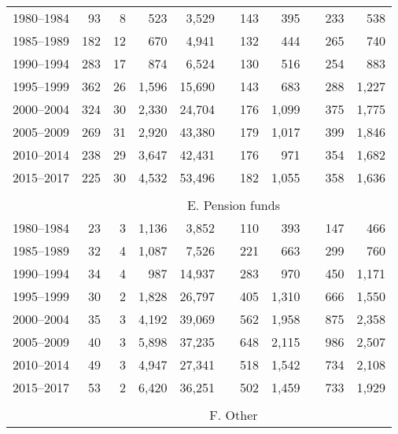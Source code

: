 \documentclass{article}
\begin{document}
\begin{table}[h]
{\begin{tabular}{rrrrrrrrrrr}
            1980–1984 & 93 & 8 & 523 & 3,529 & & 143 & 395 & & 233 & 538 \\
            1985–1989 & 182 & 12 & 670 & 4,941 & & 132 & 444 & & 265 & 740 \\
            1990–1994 & 283 & 17 & 874 & 6,524 & & 130 & 516 & & 254 & 883 \\
            1995–1999 & 362 & 26 & 1,596 & 15,690 & & 143 & 683 & & 288 & 1,227 \\
            2000–2004 & 324 & 30 & 2,330 & 24,704 & & 176 & 1,099 & & 375 & 1,775 \\
            2005–2009 & 269 & 31 & 2,920 & 43,380 & & 179 & 1,017 & & 399 & 1,846 \\
            2010–2014 & 238 & 29 & 3,647 & 42,431 & & 176 & 971 & & 354 & 1,682 \\
            2015–2017 & 225 & 30 & 4,532 & 53,496 & & 182 & 1,055 & & 358 & 1,636 \\
            
            \cline{2-11}
            \\[-2.5ex]
            & \multicolumn{10}{c}{E. Pension funds} \\ \cline{2-11}
            
            1980–1984 & 23 & 3 & 1,136 & 3,852 & & 110 & 393 & & 147 & 466 \\
            1985–1989 & 32 & 4 & 1,087 & 7,526 & & 221 & 663 & & 299 & 760 \\
            1990–1994 & 34 & 4 & 987 & 14,937 & & 283 & 970 & & 450 & 1,171 \\
            1995–1999 & 30 & 2 & 1,828 & 26,797 & & 405 & 1,310 & & 666 & 1,550 \\
            2000–2004 & 35 & 3 & 4,192 & 39,069 & & 562 & 1,958 & & 875 & 2,358 \\
            2005–2009 & 40 & 3 & 5,898 & 37,235 & & 648 & 2,115 & & 986 & 2,507 \\
            2010–2014 & 49 & 3 & 4,947 & 27,341 & & 518 & 1,542 & & 734 & 2,108 \\
            2015–2017 & 53 & 2 & 6,420 & 36,251 & & 502 & 1,459 & & 733 & 1,929 \\
            
            \cline{2-11}
            \\[-2.5ex]
            & \multicolumn{10}{c}{F. Other} \\ \cline{2-11}
            

\end{tabular}}
\end{table}
\end{document}
